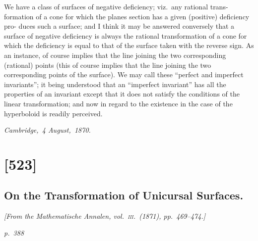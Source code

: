 \documentclass[11pt,a4paper]{book}
\begin{document}
We have a class of surfaces of negative deficiency; viz.\ any rational trans-
formation of a cone for which the planes section has a given (positive) deficiency pro-
duces such a surface; and I think it may be answered conversely that a surface of
negative deficiency is always the rational transformation of a cone for which the
deficiency is equal to that of the surface taken with the reverse sign.  As an instance,
of course implies that the line joining the two corresponding (rational) points (this
of course implies that the line joining the two corresponding points of the surface).
We may call these ``perfect and imperfect invariants''; it being understood that an
``imperfect invariant'' has all the properties of an invariant except that it does
not satisfy the conditions of the linear transformation; and now in regard to the
existence in the case of the hyperboloid is readily perceived.

\noindent\textit{Cambridge,\ 4 August,\ 1870.}

\clearpage

\section{[523]}
\subsection{On the Transformation of Unicursal Surfaces.}

\begin{center}
\textit{[From the Mathematische Annalen, vol.~\textsc{iii}.\ (1871), pp.\ 469--474.]}
\end{center}

\textit{p.~388}
\end{document}
